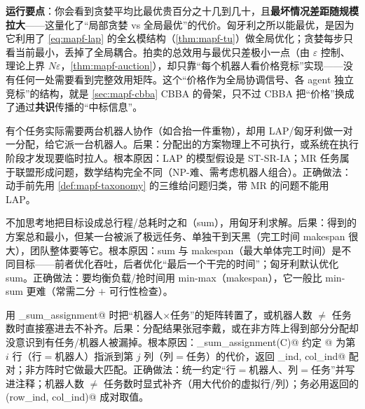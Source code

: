 \textbf{运行要点}：你会看到贪婪平均比最优贵百分之十几到几十，且\textbf{最坏情况差距随规模拉大}——这量化了“局部贪婪 vs 全局最优”的代价。匈牙利之所以能最优，是因为它利用了 \cref{eq:mapf-lap} 的全幺模结构（\cref{thm:mapf-tu}）做全局优化；贪婪每步只看当前最小，丢掉了全局耦合。拍卖的总效用与最优只差极小一点（由 $\varepsilon$ 控制、理论上界 $N\varepsilon$，\cref{thm:mapf-auction}），却只靠“每个机器人看价格竞标”实现——没有任何一处需要看到完整效用矩阵。这个“价格作为全局协调信号、各 agent 独立竞标”的结构，就是 \cref{sec:mapf-cbba} CBBA 的骨架，只不过 CBBA 把“价格”换成了通过\textbf{共识}传播的“中标信息”。

\begin{pitfall}
有个任务实际需要两台机器人协作（如合抬一件重物），却用 LAP/匈牙利做一对一分配，给它派一台机器人。后果：分配出的方案物理上不可执行，或系统在执行阶段才发现要临时拉人。根本原因：LAP 的模型假设是 ST-SR-IA；MR 任务属于联盟形成问题，数学结构完全不同（NP-难、需考虑机器人组合）。正确做法：动手前先用 \cref{def:mapf-taxonomy} 的三维给问题归类，带 MR 的问题不能用 LAP。
\end{pitfall}

\begin{pitfall}
不加思考地把目标设成总行程/总耗时之和（sum），用匈牙利求解。后果：得到的方案总和最小，但某一台被派了极远任务、单独干到天黑（完工时间 makespan 很大），团队整体要等它。根本原因：sum 与 makespan（最大单体完工时间）是不同目标——前者优化吞吐，后者优化“最后一个干完的时间”；匈牙利默认优化 sum。正确做法：要均衡负载/抢时间用 min-max（makespan），它一般比 min-sum 更难（常需二分 $+$ 可行性检查）。
\end{pitfall}

\begin{pitfall}
用 \verb@linear_sum_assignment@ 时把“机器人$\times$任务”的矩阵转置了，或机器人数 $\ne$ 任务数时直接塞进去不补齐。后果：分配结果张冠李戴，或在非方阵上得到部分分配却没意识到有任务/机器人被漏掉。根本原因：\verb@linear_sum_assignment(C)@ 约定 \verb@C[i,j]@ 为第 $i$ 行（行$=$机器人）指派到第 $j$ 列（列$=$任务）的代价，返回 \verb@row_ind, col_ind@ 配对；非方阵时它做最大匹配。正确做法：统一约定“行$=$机器人、列$=$任务”并写进注释；机器人数 $\ne$ 任务数时显式补齐（用大代价的虚拟行/列）；务必用返回的 \verb@(row_ind, col_ind)@ 成对取值。
\end{pitfall}

